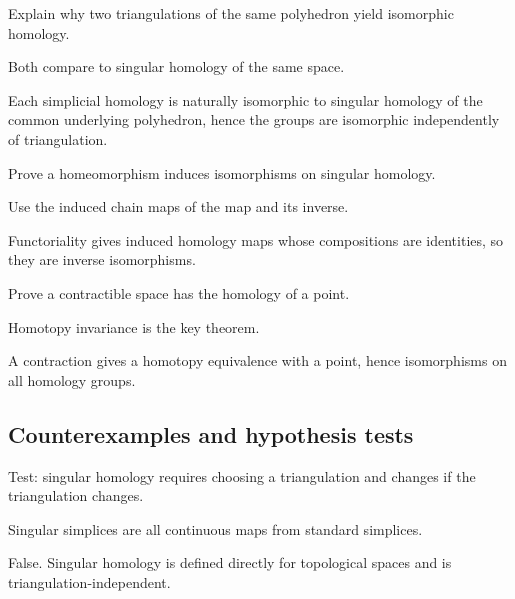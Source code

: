 \begin{exercise}\label{exr:viii17-ped-07}
Explain why two triangulations of the same polyhedron yield isomorphic homology.
\end{exercise}
\begin{hint}
Both compare to singular homology of the same space.
\end{hint}
\begin{solution}
Each simplicial homology is naturally isomorphic to singular homology of the common underlying polyhedron, hence the groups are isomorphic independently of triangulation.
\end{solution}

\begin{exercise}\label{exr:viii17-ped-08}
Prove a homeomorphism induces isomorphisms on singular homology.
\end{exercise}
\begin{hint}
Use the induced chain maps of the map and its inverse.
\end{hint}
\begin{solution}
Functoriality gives induced homology maps whose compositions are identities, so they are inverse isomorphisms.
\end{solution}

\begin{exercise}\label{exr:viii17-ped-09}
Prove a contractible space has the homology of a point.
\end{exercise}
\begin{hint}
Homotopy invariance is the key theorem.
\end{hint}
\begin{solution}
A contraction gives a homotopy equivalence with a point, hence isomorphisms on all homology groups.
\end{solution}

\subsection*{Counterexamples and hypothesis tests}

\begin{exercise}\label{exr:viii17-ped-10}
Test: singular homology requires choosing a triangulation and changes if the triangulation changes.
\end{exercise}
\begin{hint}
Singular simplices are all continuous maps from standard simplices.
\end{hint}
\begin{solution}
False. Singular homology is defined directly for topological spaces and is triangulation-independent.
\end{solution}

